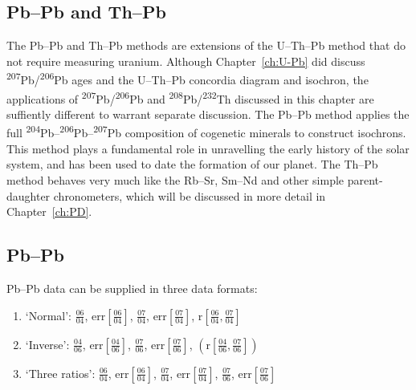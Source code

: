 \begin{refsection}

\chapter{Pb--Pb and Th--Pb}\label{ch:Th-Pb-Pb}

The Pb--Pb and Th--Pb methods are extensions of the U--Th--Pb method
that do not require measuring uranium. Although Chapter~\ref{ch:U-Pb}
did discuss \textsuperscript{207}Pb/\textsuperscript{206}Pb ages and
the U--Th--Pb concordia diagram and isochron, the applications of
\textsuperscript{207}Pb/\textsuperscript{206}Pb and
\textsuperscript{208}Pb/\textsuperscript{232}Th discussed in this
chapter are suffiently different to warrant separate discussion.  The
Pb--Pb method applies the full
\textsuperscript{204}Pb--\textsuperscript{206}Pb--\textsuperscript{207}Pb
composition of cogenetic minerals to construct isochrons. This method
plays a fundamental role in unravelling the early history of the solar
system, and has been used to date the formation of our planet. The
Th--Pb method behaves very much like the Rb--Sr, Sm--Nd and other
simple parent-daughter chronometers, which will be discussed in more
detail in Chapter~\ref{ch:PD}.

\section{Pb--Pb}\label{sec:PbPb}

Pb--Pb data can be supplied in three data formats:
\begin{enumerate}
\item{`Normal':}
  $\frac{06}{04}$,  
  $\mbox{err}\!\left[\frac{06}{04}\right]$, 
  $\frac{07}{04}$,  
  $\mbox{err}\!\left[\frac{07}{04}\right]$,  
  $\mbox{r}\!\left[\frac{06}{04},\frac{07}{04}\right]$
\item{`Inverse':}
  $\frac{04}{06}$,  
  $\mbox{err}\!\left[\frac{04}{06}\right]$, 
  $\frac{07}{06}$,  
  $\mbox{err}\!\left[\frac{07}{06}\right]$,  
  $\left(\mbox{r}\!\left[\frac{04}{06},\frac{07}{06}\right]\right)$
\item{`Three ratios':}
  $\frac{06}{04}$, 
  $\mbox{err}\!\left[\frac{06}{04}\right]$, 
  $\frac{07}{04}$, 
  $\mbox{err}\!\left[\frac{07}{04}\right]$, 
  $\frac{07}{06}$, 
  $\mbox{err}\!\left[\frac{07}{06}\right]$
\end{enumerate}


\end{refsection}
